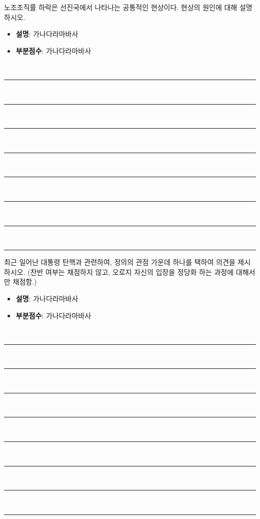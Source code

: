 \documentclass[11pt,answers]{exam} %
\begin{document}
\begin{questions}
\question[20]  노조조직률 하락은 선진국에서 나타나는 공통적인 현상이다. 현상의 원인에 대해 설명하시오.
    \ifprintanswers\relax
        \begin{itemize}
            \item \textbf{설명}: 가나다라마바사
            \item \textbf{부분점수}: 가나다라마바사
        \end{itemize}
    \else
        \\[3pt]
        \rule{\linewidth}{0.4pt} \\[3pt]
        \rule{\linewidth}{0.4pt} \\[3pt]
        \rule{\linewidth}{0.4pt} \\[3pt]
        \rule{\linewidth}{0.4pt} \\[3pt]
        \rule{\linewidth}{0.4pt} \\[3pt]
        \rule{\linewidth}{0.4pt} \\[3pt]
        \rule{\linewidth}{0.4pt} \\[3pt]
        \rule{\linewidth}{0.4pt}
    \fi
\question[10] 최근 일어난 대통령 탄핵과 관련하여, 정의의 관점 가운데 하나를 택하여 의견을 제시하시오. (찬반 여부는 채점하지 않고, 오로지 자신의 입장을 정당화 하는 과정에 대해서만 채점함.)
    \ifprintanswers\relax
        \begin{itemize}
            \item \textbf{설명}: 가나다라마바사
            \item \textbf{부분점수}: 가나다라마바사
        \end{itemize}
    \else
        \\[3pt]
        \rule{\linewidth}{0.4pt} \\[3pt]
        \rule{\linewidth}{0.4pt} \\[3pt]
        \rule{\linewidth}{0.4pt} \\[3pt]
        \rule{\linewidth}{0.4pt} \\[3pt]
        \rule{\linewidth}{0.4pt} \\[3pt]
        \rule{\linewidth}{0.4pt} \\[3pt]
        \rule{\linewidth}{0.4pt} \\[3pt]
        \rule{\linewidth}{0.4pt}
    \fi


\end{questions}
\end{document}
